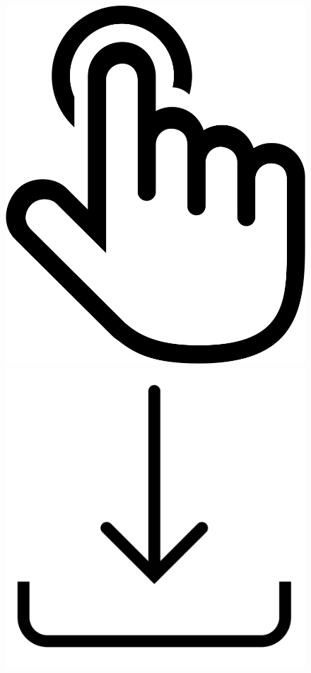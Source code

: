 \documentclass[intlimits, 9pt, unicode]{beamer}
\begin{document}
\begin{frame}
\begin{figure}
\includegraphics[scale=0.02]{images/scheme_click}
\includegraphics[scale=0.02]{images/scheme_conversion}
\end{figure}


\end{frame}
\end{document}
